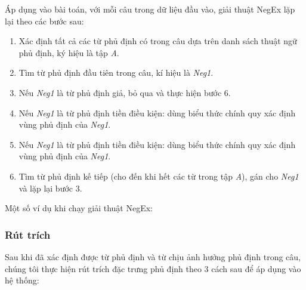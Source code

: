 Áp dụng vào bài toán, với mỗi câu trong dữ liệu đầu vào, giải thuật NegEx lặp lại theo các bước sau:

\begin{enumerate}
\item Xác định tất cả các từ phủ định có trong câu dựa trên danh sách thuật ngữ phủ định, ký hiệu là tập \textit{A}.
\item Tìm từ phủ định đầu tiên trong câu, kí hiệu là \textit{Neg1}.
\item Nếu \textit{Neg1} là từ phủ định giả, bỏ qua và thực hiện bước 6.
\item Nếu \textit{Neg1} là từ phủ định tiền điều kiện: dùng biểu thức chính quy  xác định vùng phủ định của \textit{Neg1}.
\item Nếu \textit{Neg1} là từ phủ định tiền điều kiện: dùng biểu thức chính quy  xác định vùng phủ định của \textit{Neg1}.
\item Tìm từ phủ định kế tiếp (cho đến khi hết các từ trong tập \textit{A}), gán cho \textit{Neg1} và lặp lại bước 3.
\end{enumerate}

Một số ví dụ khi chạy giải thuật NegEx:


\subsubsection*{Rút trích}
Sau khi đã xác định được từ phủ định và từ chịu ảnh hưởng phủ định trong câu, chúng tôi thực hiện rút trích đặc trưng phủ định theo 3 cách sau để áp dụng vào hệ thống:\\


